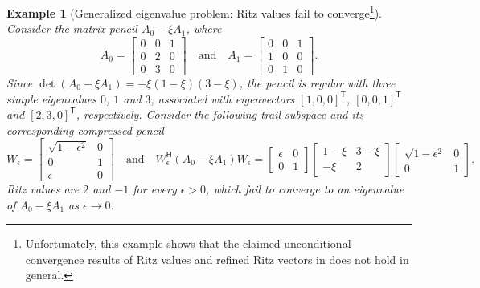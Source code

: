 \documentclass[a4paper,11pt]{article}
\newtheorem{example}{Example}
\newcommand{\Ttran}{\mathsf{T}}
\newcommand{\Htran}{\mathsf{H}}
\begin{document}
\begin{example}[Generalized eigenvalue problem: Ritz values fail to converge\footnote{Unfortunately, this example shows that the claimed unconditional convergence results of Ritz values and refined Ritz vectors in \cite{Jia2025} does not hold in general.}]
    \label{eg:G}
    Consider the matrix pencil $A_{0}-\xi A_{1}$, where
\begin{equation*}
    A_{0}= \begin{bmatrix}
        0 & 0 & 1\\
        0 & 2 & 0\\
        0 & 3 & 0
    \end{bmatrix}
    \quad\text{and}\quad
    A_{1}= \begin{bmatrix}
        0 & 0 & 1\\
        1 & 0 & 0\\
        0 & 1 & 0
    \end{bmatrix}.
\end{equation*}
Since $\det (A_{0}-\xi A_{1}) = -\xi(1-\xi)(3-\xi)$, the pencil is regular with three simple eigenvalues $0$, $1$ and $3$, associated with eigenvectors $[1,0,0]^{\Ttran}$, $[0,0,1]^{\Ttran}$ and $[2,3,0]^{\Ttran}$, respectively.
Consider the following trail subspace and its corresponding compressed pencil
\begin{equation*}
    W_{\epsilon} = \begin{bmatrix}
        \sqrt{1-\epsilon^{2}} & 0\\
        0 & 1\\
        \epsilon & 0
    \end{bmatrix}
    \quad\text{and}\quad
    W_{\epsilon}^{\Htran}(A_{0}-\xi A_{1})W_{\epsilon} = \begin{bmatrix}
        \epsilon &0\\
        0& 1
    \end{bmatrix}
    \begin{bmatrix}
        1-\xi & 3-\xi\\
        -\xi & 2
    \end{bmatrix}\begin{bmatrix}
        \sqrt{1-\epsilon^{2}} & 0\\
        0& 1
    \end{bmatrix}.
\end{equation*}
Ritz values are $2$ and $-1$ for every $\epsilon>0$, which fail to converge to an eigenvalue of $A_{0}-\xi A_{1}$ as $\epsilon \to 0$.
\end{example}
\end{document}
